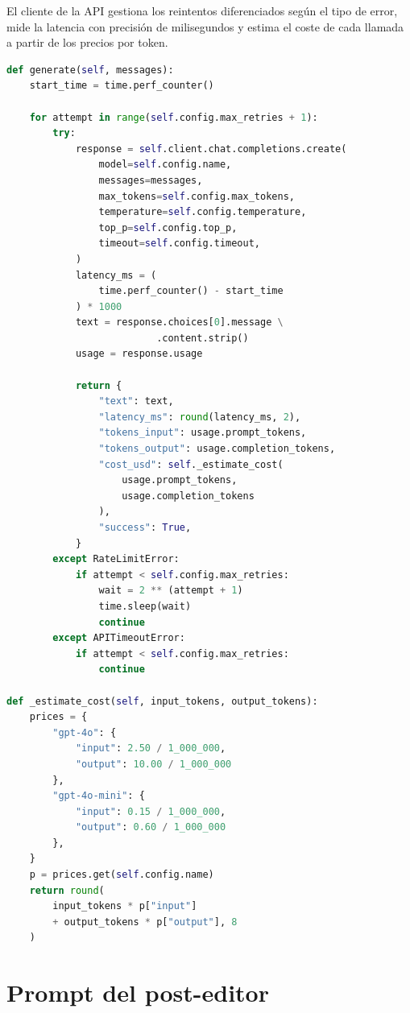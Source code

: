 El cliente de la API gestiona los reintentos diferenciados según el tipo de error, mide la latencia con precisión de milisegundos y estima el coste de cada llamada a partir de los precios por token.

\begin{lstlisting}[language=Python,caption={Cliente de API con reintentos y estimación de coste (\texttt{llm\_client.py}).},label={lst:llm-client},basicstyle=\ttfamily\small,xleftmargin=1cm]
def generate(self, messages):
    start_time = time.perf_counter()

    for attempt in range(self.config.max_retries + 1):
        try:
            response = self.client.chat.completions.create(
                model=self.config.name,
                messages=messages,
                max_tokens=self.config.max_tokens,
                temperature=self.config.temperature,
                top_p=self.config.top_p,
                timeout=self.config.timeout,
            )
            latency_ms = (
                time.perf_counter() - start_time
            ) * 1000
            text = response.choices[0].message \
                          .content.strip()
            usage = response.usage

            return {
                "text": text,
                "latency_ms": round(latency_ms, 2),
                "tokens_input": usage.prompt_tokens,
                "tokens_output": usage.completion_tokens,
                "cost_usd": self._estimate_cost(
                    usage.prompt_tokens,
                    usage.completion_tokens
                ),
                "success": True,
            }
        except RateLimitError:
            if attempt < self.config.max_retries:
                wait = 2 ** (attempt + 1)
                time.sleep(wait)
                continue
        except APITimeoutError:
            if attempt < self.config.max_retries:
                continue

def _estimate_cost(self, input_tokens, output_tokens):
    prices = {
        "gpt-4o": {
            "input": 2.50 / 1_000_000,
            "output": 10.00 / 1_000_000
        },
        "gpt-4o-mini": {
            "input": 0.15 / 1_000_000,
            "output": 0.60 / 1_000_000
        },
    }
    p = prices.get(self.config.name)
    return round(
        input_tokens * p["input"]
        + output_tokens * p["output"], 8
    )
\end{lstlisting}

\section{Prompt del post-editor}

